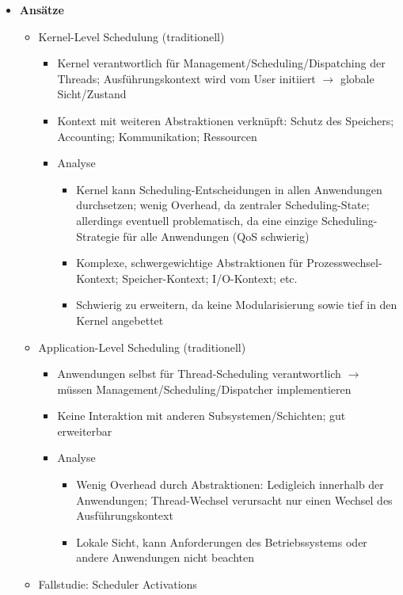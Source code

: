 \begin{itemize}
\begin{description}
	\end{description}
	\item \textbf{Ansätze}
	\begin{itemize}
		\item Kernel-Level Schedulung (traditionell)
		\begin{itemize}
			\item Kernel verantwortlich für Management/Scheduling/Dispatching der Threads; Ausführungskontext wird vom User initiiert \(\rightarrow\) globale Sicht/Zustand
			\item Kontext mit weiteren Abstraktionen verknüpft: Schutz des Speichers; Accounting; Kommunikation; Ressourcen
			\item Analyse
			\begin{itemize}
				\item Kernel kann Scheduling-Entscheidungen in allen Anwendungen durchsetzen; wenig Overhead, da zentraler Scheduling-State; allerdings eventuell problematisch, da eine einzige Scheduling-Strategie für alle Anwendungen (QoS schwierig)
				\item Komplexe, schwergewichtige Abstraktionen für Prozesswechsel-Kontext; Speicher-Kontext; I/O-Kontext; etc.
				\item Schwierig zu erweitern, da keine Modularisierung sowie tief in den Kernel angebettet
			\end{itemize}
		\end{itemize}
		\item Application-Level Scheduling (traditionell)
		\begin{itemize}
			\item Anwendungen selbst für Thread-Scheduling verantwortlich \(\rightarrow\) müssen Management/Scheduling/Dispatcher implementieren
			\item Keine Interaktion mit anderen Subsystemen/Schichten; gut erweiterbar
			\item Analyse
			\begin{itemize}
				\item Wenig Overhead durch Abstraktionen: Ledigleich innerhalb der Anwendungen; Thread-Wechsel verursacht nur einen Wechsel des Ausführungskontext
				\item Lokale Sicht, kann Anforderungen des Betriebssystems oder andere Anwendungen nicht beachten
			\end{itemize}
		\end{itemize}
		\item Fallstudie: Scheduler Activations
		\begin{itemize}

\end{itemize}
\end{itemize}
\end{itemize}
